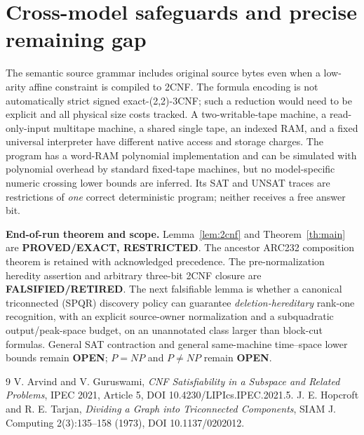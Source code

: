 \documentclass[10pt]{article}
\begin{document}
\section{Cross-model safeguards and precise remaining gap}
The semantic source grammar includes original source bytes even when a low-arity affine constraint is compiled to 2CNF. The formula encoding is not automatically strict signed exact-(2,2)-3CNF; such a reduction would need to be explicit and all physical size costs tracked. A two-writable-tape machine, a read-only-input multitape machine, a shared single tape, an indexed RAM, and a fixed universal interpreter have different native access and storage charges. The program has a word-RAM polynomial implementation and can be simulated with polynomial overhead by standard fixed-tape machines, but no model-specific numeric crossing lower bounds are inferred. Its SAT and UNSAT traces are restrictions of \emph{one} correct deterministic program; neither receives a free answer bit.

\noindent\textbf{End-of-run theorem and scope.} Lemma~\ref{lem:2cnf} and Theorem~\ref{th:main} are \textbf{PROVED/EXACT, RESTRICTED}. The ancestor ARC232 composition theorem is retained with acknowledged precedence. The pre-normalization heredity assertion and arbitrary three-bit 2CNF closure are \textbf{FALSIFIED/RETIRED}. The next falsifiable lemma is whether a canonical triconnected (SPQR) discovery policy can guarantee \emph{deletion-hereditary} rank-one recognition, with an explicit source-owner normalization and a subquadratic output/peak-space budget, on an unannotated class larger than block-cut formulas. General SAT contraction and general same-machine time--space lower bounds remain \textbf{OPEN}; $P=NP$ and $P\ne NP$ remain \textbf{OPEN}.

\begin{thebibliography}{9}
 V. Arvind and V. Guruswami, \emph{CNF Satisfiability in a Subspace and Related Problems}, IPEC 2021, Article 5, DOI 10.4230/LIPIcs.IPEC.2021.5.
 J. E. Hopcroft and R. E. Tarjan, \emph{Dividing a Graph into Triconnected Components}, SIAM J. Computing 2(3):135--158 (1973), DOI 10.1137/0202012.
\end{thebibliography}
\end{document}
